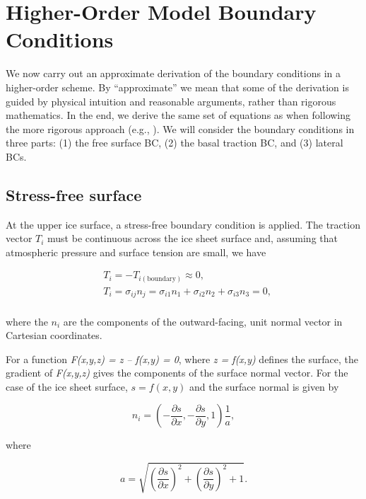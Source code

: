 
\section{Higher-Order Model Boundary Conditions}
\label{sc:higher-order-bcs}

We now carry out an approximate derivation of the boundary conditions in a higher-order scheme. By ``approximate'' we mean that some of the derivation is guided by physical intuition and reasonable arguments, rather than rigorous mathematics. In the end, we derive the same set of equations as when following the more rigorous approach (e.g., \citet{DUKOWICZ:2010wb}). We will consider the boundary conditions in three parts: (1) the free surface BC, (2) the basal traction BC, and (3) lateral BCs.

\subsection{Stress-free surface}
At the upper ice surface, a stress-free boundary condition is applied. The traction vector $T_i$ must be continuous across the ice sheet surface and, assuming that atmospheric pressure and surface tension are small, we have

\begin{equation}
  \label{ho.eq.surface_traction}
  \begin{split}
    & T_{i} = -T_{i(\textrm{boundary})}\approx 0, \\ 
    & T_{i} = \sigma _{ij}n_{j} = \sigma _{i1}n_{1} + \sigma _{i2}n_{2} + \sigma _{i3}n_{3} = 0, \\
  \end{split}
\end{equation}

\noindent
where the $n_i$ are the components of the outward-facing, unit normal vector in Cartesian coordinates.

For a function \textit{F(x,y,z) = z -- f(x,y) = 0}, where \textit{z = f(x,y)} defines the surface, the gradient of \textit{F(x,y,z)} gives the components of the surface normal vector. For the case of the ice sheet surface, $s = f(x,y)$ and the surface normal is given by

\begin{equation}
  n_{i}=\left( -\frac{\partial s}{\partial x},-\frac{\partial s}{\partial y},1 \right)\frac{1}{a},
\end{equation}

\noindent
where

\begin{equation}
  a = \sqrt{\left( \frac{\partial s}{\partial x} \right)^{2} + \left( \frac{\partial s}{\partial y} \right)^{2} + 1}.
\end{equation}

